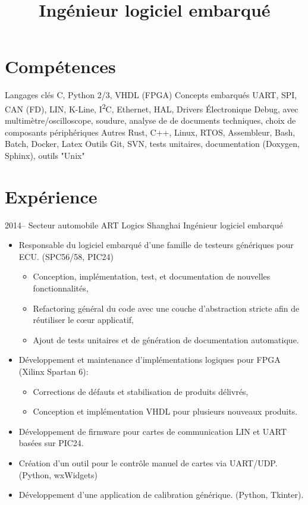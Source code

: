 \documentclass[11pt,a4paper,sans]{moderncv}        %
\title{Ingénieur logiciel embarqué}
\begin{document}
\makecvtitle

\section{Compétences}
\cvitem
  {Langages clés}
  {C, Python 2/3, VHDL (FPGA)}
\cvitem
  {Concepts embarqués}
  {UART, SPI, CAN (FD), LIN, K-Line, I\textsuperscript{2}C, Ethernet, HAL, Drivers}
\cvitem
  {Électronique}
  {Debug, avec multimètre/oscilloscope, soudure, analyse de de documents techniques, choix de composants périphériques}
\cvitem
  {Autres}
  {Rust, C++, Linux, RTOS, Assembleur, Bash, Batch, Docker, Latex}
\cvitem
  {Outils}
  {Git, SVN, tests unitaires, documentation (Doxygen, Sphinx), outils "Unix"}

\section{Expérience}
\cventry
  {2014--\the\year}
  {Secteur automobile}
  {ART Logics}
  {Shanghai}
  {Ingénieur logiciel embarqué}
  {
    \begin{itemize}%
    \item Responsable du logiciel embarqué d'une famille de testeurs génériques pour ECU. (SPC56/58, PIC24)
      \begin{itemize}%
      \item Conception, implémentation, test, et documentation de nouvelles fonctionnalités,
      \item Refactoring général du code avec une couche d'abstraction stricte afin de réutiliser le cœur applicatif,
      \item Ajout de tests unitaires et de génération de documentation automatique.
      \end{itemize}
    \item Développement et maintenance d'implémentations logiques pour FPGA (Xilinx Spartan 6):
      \begin{itemize}%
      \item Corrections de défauts et stabilisation de produits délivrés,
      \item Conception et implémentation VHDL pour plusieurs nouveaux produits.
      \end{itemize}
    \item Développement de firmware pour cartes de communication LIN et UART basées sur PIC24.
    \item Création d'un outil pour le contrôle manuel de cartes via UART/UDP. (Python, wxWidgets)
    \item Développement d'une application de calibration générique. (Python, Tkinter).
    \end{itemize}
  }
\end{document}
